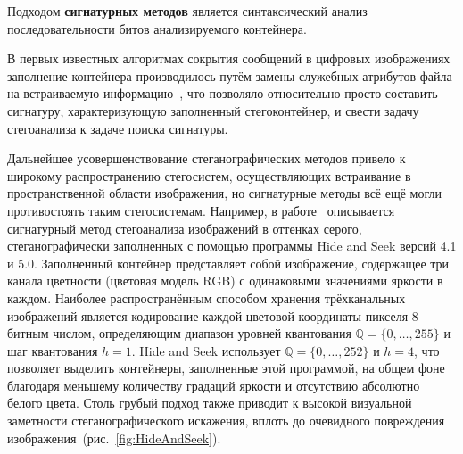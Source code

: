 Подходом \textbf{сигнатурных методов} является синтаксический анализ последовательности битов анализируемого контейнера.

В первых известных алгоритмах сокрытия сообщений в цифровых изображениях заполнение контейнера производилось путём замены служебных атрибутов файла на встраиваемую информацию~\cite{FridrichBook}, что позволяло относительно просто составить сигнатуру, характеризующую заполненный стегоконтейнер, и свести задачу стегоанализа к задаче поиска сигнатуры.

Дальнейшее усовершенствование стеганографических методов привело к широкому распространению стегосистем, осуществляющих встраивание в пространственной области изображения, но сигнатурные методы всё ещё могли противостоять таким стегосистемам. Например, в работе~\cite{HideAndSeek} описывается сигнатурный метод стегоанализа изображений в оттенках серого, стеганографически заполненных с помощью программы Hide and Seek версий 4.1 и 5.0. Заполненный контейнер представляет собой изображение, содержащее три канала цветности (цветовая модель RGB) с одинаковыми значениями яркости в каждом. Наиболее распространённым способом хранения трёхканальных изображений является кодирование каждой цветовой координаты пикселя 8-битным числом, определяющим диапазон уровней квантования $ \mathbb{Q} = \{0, \dotsc,255\} $ и шаг квантования $ h = 1 $. Hide and Seek использует $ \mathbb{Q} = \{0, \dotsc,252\} $ и $ h = 4 $, что позволяет выделить контейнеры, заполненные этой программой, на общем фоне благодаря меньшему количеству градаций яркости и отсутствию абсолютно белого цвета. Столь грубый подход также приводит к высокой визуальной заметности стеганографического искажения, вплоть до очевидного повреждения изображения~(рис.~\ref{fig:HideAndSeek}).

